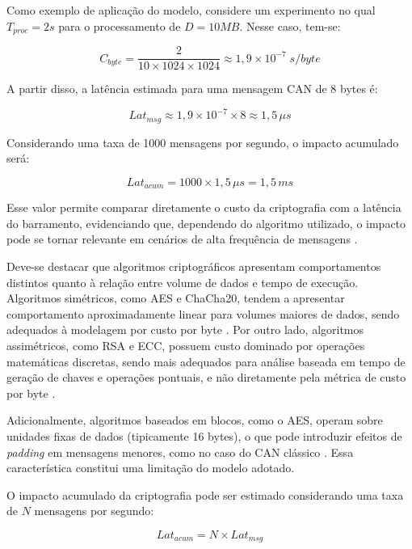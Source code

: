 Como exemplo de aplicação do modelo, considere um experimento no qual $T_{proc} = 2s$ para o processamento de $D = 10MB$. Nesse caso, tem-se:

\begin{equation}
C_{byte} = \frac{2}{10 \times 1024 \times 1024} \approx 1{,}9 \times 10^{-7} \; s/byte
\end{equation}

A partir disso, a latência estimada para uma mensagem CAN de 8 bytes é:

\begin{equation}
Lat_{msg} \approx 1{,}9 \times 10^{-7} \times 8 \approx 1{,}5 \, \mu s
\end{equation}

Considerando uma taxa de 1000 mensagens por segundo, o impacto acumulado será:

\begin{equation}
Lat_{acum} = 1000 \times 1{,}5 \, \mu s = 1{,}5 \, ms
\end{equation}

Esse valor permite comparar diretamente o custo da criptografia com a latência do barramento, evidenciando que, dependendo do algoritmo utilizado, o impacto pode se tornar relevante em cenários de alta frequência de mensagens \cite{burns2001real}.

Deve-se destacar que algoritmos criptográficos apresentam comportamentos distintos quanto à relação entre volume de dados e tempo de execução. Algoritmos simétricos, como AES e ChaCha20, tendem a apresentar comportamento aproximadamente linear para volumes maiores de dados, sendo adequados à modelagem por custo por byte \cite{bernstein2008chacha}. Por outro lado, algoritmos assimétricos, como RSA e ECC, possuem custo dominado por operações matemáticas discretas, sendo mais adequados para análise baseada em tempo de geração de chaves e operações pontuais, e não diretamente pela métrica de custo por byte \cite{gura2004comparing}.

Adicionalmente, algoritmos baseados em blocos, como o AES, operam sobre unidades fixas de dados (tipicamente 16 bytes), o que pode introduzir efeitos de \textit{padding} em mensagens menores, como no caso do CAN clássico \cite{daemen2002design}. Essa característica constitui uma limitação do modelo adotado.

O impacto acumulado da criptografia pode ser estimado considerando uma taxa de $N$ mensagens por segundo:

\begin{equation}
Lat_{acum} = N \times Lat_{msg}
\end{equation}


